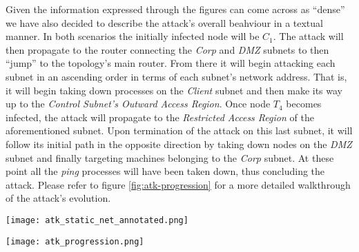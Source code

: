             Given the information expressed through the figures can come across as ``dense'' we have also decided to describe the attack's overall beahviour in a textual manner. In both scenarios the initially infected node will be $C_1$. The attack will then propagate to the router connecting the \textit{Corp} and \textit{DMZ} subnets to then ``jump'' to the topology's main router. From there it will begin attacking each subnet in an ascending order in terms of each subnet's network address. That is, it will begin taking down processes on the \textit{Client} subnet and then make its way up to the \textit{Control Subnet's Outward Access Region}. Once node $T_4$ becomes infected, the attack will propagate to the \textit{Restricted Access Region} of the aforementioned subnet. Upon termination of the attack on this last subnet, it will follow its initial path in the opposite direction by taking down nodes on the \textit{DMZ} subnet and finally targeting machines belonging to the \textit{Corp} subnet. At these point all the \textit{ping} processes will have been taken down, thus concluding the attack. Please refer to figure \ref{fig:atk-progression} for a more detailed walkthrough of the attack's evolution.\\


            \begin{sidewaysfigure}
                \centering
                \texttt{[image: atk\_static\_net\_annotated.png]}
                \caption[Annotated \textit{QoS} on a Static Topology]{Annotated Evolution of the \textit{QoS} Over Time for a Static Topology.}
                \label{fig:static-atk-annotated}
            \end{sidewaysfigure}

            \begin{sidewaysfigure}
                \centering
                \texttt{[image: atk\_progression.png]}
                \caption[Attack Progression]{Attack Progression Over the Network.}
                \label{fig:atk-progression}
            \end{sidewaysfigure}

